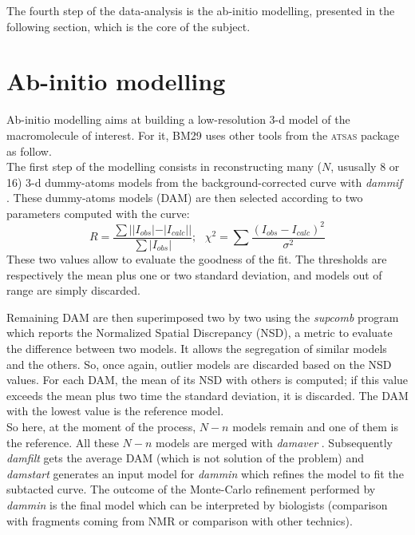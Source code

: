 \documentclass[a4paper, 11pt]{report}
\begin{document}
The fourth step of the data-analysis is the ab-initio modelling, 
presented in the following section, which is the core of the subject.

\section{Ab-initio modelling}
\label{modelling}                           %

Ab-initio modelling aims at building a low-resolution 3-d  
model of the macromolecule of interest. 
For it, BM29 uses other tools from the \textsc{atsas} package as 
follow.\\

The first step of the modelling consists in reconstructing many ($N$, ususally 8
or 16) 3-d dummy-atoms models from the background-corrected curve with 
\textit{dammif} \cite{dammif}. 
These dummy-atoms models (DAM) are then selected according to two 
parameters computed with the curve: 
\[
R = \frac {\sum {||I_{obs}| - |I_{calc}||}}{\sum {|I_{obs}|}}; \ \ \ 
\chi^{2} = \sum {\frac {(I_{obs} - I_{calc})^{2}}{\sigma^{2}}}
\]
These two values allow to evaluate the goodness of the fit. 
The thresholds are respectively the mean plus one or two standard 
deviation, and models out of range are simply discarded.

Remaining DAM are then superimposed two by two using the \textit{supcomb}
\cite{supcomb} program which reports the Normalized Spatial
Discrepancy (NSD), a metric to evaluate the difference between two
models.
It allows the segregation of similar models and the others. 
So, once again, outlier models are discarded based on the NSD
values.
For each DAM, the mean of its NSD with others is computed; 
if this value exceeds the mean plus two time the standard 
deviation, it is discarded. 
The DAM with the lowest value is the reference model.\\

So here, at the moment of the process, $N - n$ models remain and one 
of them is the reference. 
All these $N - n$ models are merged with \textit{damaver} 
\cite{damaver}. 
Subsequently \textit{damfilt} gets the average DAM (which is not solution of
the problem) and \textit{damstart} generates an input model for 
\textit{dammin} \cite{dammin} which refines the model to fit the 
subtacted curve. 
The outcome of the Monte-Carlo refinement performed by \textit{dammin} is the
final model which can be interpreted by biologists (comparison with fragments
coming from NMR or comparison with other technics).
\end{document}
